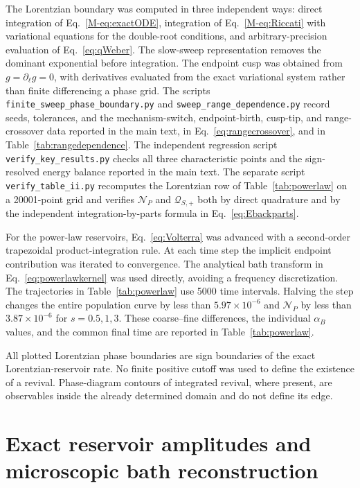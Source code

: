 \documentclass[reprint,superscriptaddress,floatfix,amsmath,amssymb,prresearch,aps]{revtex4-2}
\begin{document}
The Lorentzian boundary was computed in three independent ways: direct
integration of Eq.~\eqref{M-eq:exactODE}, integration of
Eq.~\eqref{M-eq:Riccati} with variational equations for the double-root
conditions, and arbitrary-precision evaluation of Eq.~\eqref{eq:qWeber}.
The slow-sweep representation removes the dominant exponential before
integration. The endpoint cusp was obtained from
\(g=\partial_\ell g=0\), with derivatives evaluated from the exact
variational system rather than finite differencing a phase grid.
The scripts \texttt{finite\_sweep\_phase\_boundary.py} and
\texttt{sweep\_range\_dependence.py} record seeds, tolerances, and the
mechanism-switch, endpoint-birth, cusp-tip, and range-crossover data reported
in the main text, in Eq.~\eqref{eq:rangecrossover}, and in
Table~\ref{tab:rangedependence}. The independent regression script
\texttt{verify\_key\_results.py} checks all three characteristic points and
the sign-resolved energy balance reported in the main text.
The separate script \texttt{verify\_table\_ii.py} recomputes the Lorentzian
row of Table~\ref{tab:powerlaw} on a 20001-point grid and verifies
\(\mathcal N_P\) and \(\mathcal Q_{S,+}\) both by direct quadrature and by the
independent integration-by-parts formula in Eq.~\eqref{eq:Ebackparts}.

For the power-law reservoirs, Eq.~\eqref{eq:Volterra} was advanced with a
second-order trapezoidal product-integration rule. At each time step the
implicit endpoint contribution was iterated to convergence. The analytical
bath transform in Eq.~\eqref{eq:powerlawkernel} was used directly, avoiding a
frequency discretization. The trajectories in Table~\ref{tab:powerlaw} use
5000 time intervals. Halving the step changes the entire population curve
by less than \(5.97\times10^{-6}\) and \(\mathcal N_P\) by less than
\(3.87\times10^{-6}\) for \(s=0.5,1,3\). These coarse--fine differences,
the individual \(\alpha_B\) values, and the common final time are reported in
Table~\ref{tab:powerlaw}.

All plotted Lorentzian phase boundaries are sign boundaries of the exact
Lorentzian-reservoir rate. No finite positive cutoff was used to define the existence of a
revival. Phase-diagram contours of integrated revival, where present, are
observables inside the already determined domain and do not define its edge.

\section{Exact reservoir amplitudes and microscopic bath reconstruction}
\label{app:reservoir_amplitudes}
\end{document}
